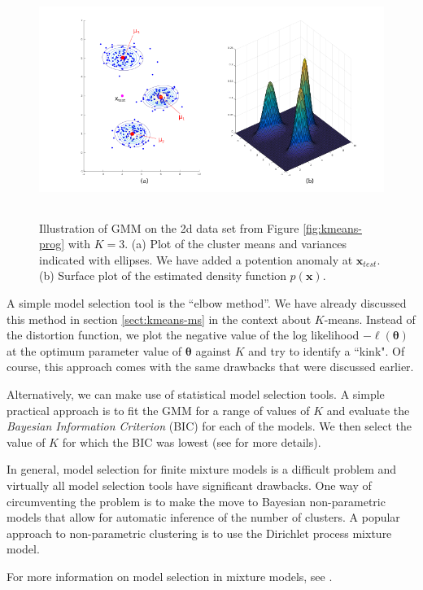 \documentclass[final,3p,times,twocolumn]{elsarticle}
\let\bs\boldsymbol
\begin{document}
\begin{figure}
\centering
\includegraphics[width=\textwidth,height=3in]{gmmdemo.png}
\caption{Illustration of GMM on the 2d data set from Figure \ref{fig:kmeans-prog} with $K=3$. 
(a) Plot of the cluster means and variances indicated with ellipses. We have added a potention anomaly at $\bs x_{test}$. 
(b) Surface plot of the estimated density function $p(\bs x)$.}
\label{fig:gmm-demo}
\end{figure}

A simple model selection tool is the ``elbow method''.
We have already discussed this method in section \ref{sect:kmeans-ms} in the context about $K$-means.
Instead of the distortion function, we plot the negative value of the log likelihood $-\ell(\bs\theta)$ at the optimum parameter value of $\bs\theta$ against $K$ and try to identify a ``kink".
Of course, this approach comes with the same drawbacks that were discussed earlier.

Alternatively, we can make use of statistical model selection tools.
A simple practical approach is to fit the GMM for a range of values of $K$ and evaluate the \emph{Bayesian Information Criterion} (BIC) for each of the models.
We then select the value of $K$ for which the BIC was lowest (see \cite{fraley2002} for more details).

In general, model selection for finite mixture models is a difficult problem and virtually all model selection tools have significant drawbacks. 
One way of circumventing the problem is to make the move to Bayesian non-parametric models that allow for automatic inference of the number of clusters.
A popular approach to non-parametric clustering is to use the Dirichlet process mixture model.

For more information on model selection in mixture models, see \cite{Murphy}.
\end{document}

